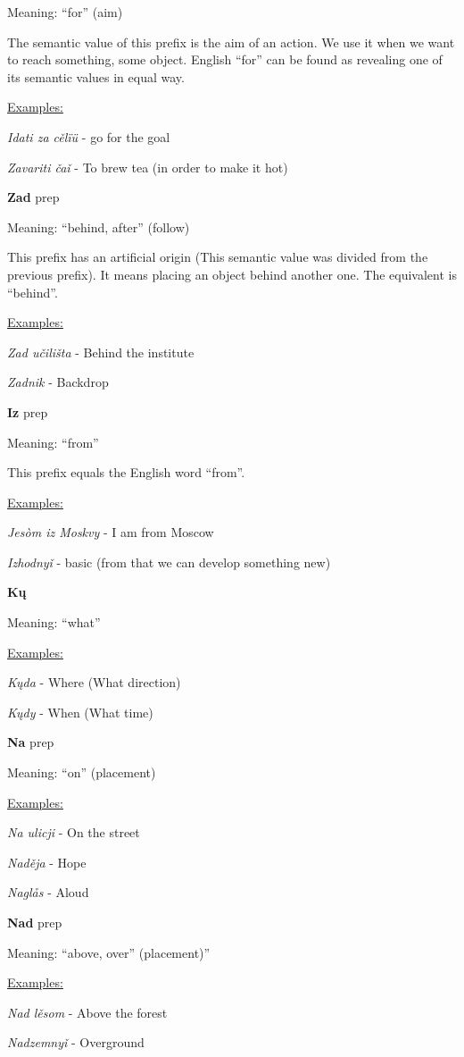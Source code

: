 Meaning: “for” (aim)

The semantic value of this prefix is the aim of an action. We use it when we want to reach something, some object. English “for” can be found as revealing one of its semantic values in equal way. 

\underline{Examples:}

\textit{Idati za cělïü} - go for the goal

\textit{Zavariti čaǐ }- To brew tea (in order to make it hot)

\textbf{Zad} \gls{prep}

Meaning: “behind, after” (follow)

This prefix has an artificial origin (This semantic value was divided from the previous prefix). It means placing an object behind another one. The equivalent is “behind”.

\underline{Examples:}

\textit{Zad učilišta} - Behind the institute

\textit{Zadnik} - Backdrop

\textbf{Iz} \gls{prep}

Meaning: “from”

This prefix equals the English word “from”. 

\underline{Examples:}

\textit{Jesòm iz Moskvy} - I am from Moscow

\textit{Izhodnyǐ} - basic (from that we can develop something new)

\textbf{Kų}

Meaning: “what”

\underline{Examples:}

\textit{Kųda} - Where (What direction)

\textit{Kųdy} - When (What time) 

\textbf{Na} \gls{prep}

Meaning: “on” (placement)

\underline{Examples:}

\textit{Na ulicji} - On the street

\textit{Naděja} - Hope

\textit{Naglås} - Aloud

\textbf{Nad} \gls{prep}

Meaning: “above, over” (placement)”

\underline{Examples:}

\textit{Nad lěsom} - Above the forest

\textit{Nadzemnyǐ} - Overground

